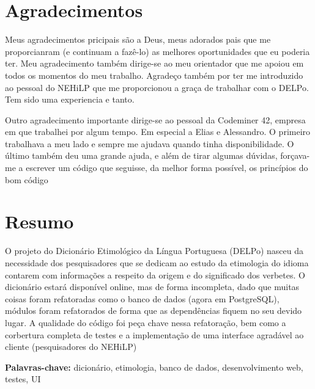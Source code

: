 \documentclass[12pt,twoside,a4paper,openany]{book}
\begin{document}

    \chapter*{Agradecimentos}

    Meus agradecimentos pricipais são a Deus, meus adorados pais que me proporcianram
    (e continuam a fazê-lo) as melhores oportunidades que eu poderia ter. Meu
    agradecimento também dirige-se ao meu orientador que me apoiou em todos os momentos
    do meu trabalho. Agradeço também por ter me introduzido ao pessoal do NEHiLP que
    me proporcionou a graça de trabalhar com o DELPo. Tem sido uma experiencia e tanto.

    Outro agradecimento importante dirige-se ao pessoal da Codeminer 42, empresa em que
    trabalhei por algum tempo. Em especial a Elias e Alessandro. O primeiro trabalhava
    a meu lado e sempre me ajudava quando tinha disponibilidade. O último também deu
    uma grande ajuda, e além de tirar algumas dúvidas, forçava-me a escrever um código
    que seguisse, da melhor forma possível, os princípios do bom código


    \chapter*{Resumo}

    O projeto do Dicionário Etimológico da Língua Portuguesa (DELPo) nasceu da necessidade
    dos pesquisadores que se dedicam ao estudo da etimologia do idioma contarem com
    informações a respeito da origem e do significado dos verbetes. O dicionário estará
    disponível online, mas de forma incompleta, dado que muitas coisas foram refatoradas
    como o banco de dados (agora em PostgreSQL), módulos foram refatorados de forma que as
    dependências fiquem no seu devido lugar. A qualidade do código foi peça chave nessa
    refatoração, bem como a corbertura completa de testes e a implementação de uma interface
    agradável ao cliente (pesquisadores do NEHiLP)

    \noindent \textbf{Palavras-chave:} dicionário, etimologia, banco de dados,
    desenvolvimento web, testes, UI

\end{document}
